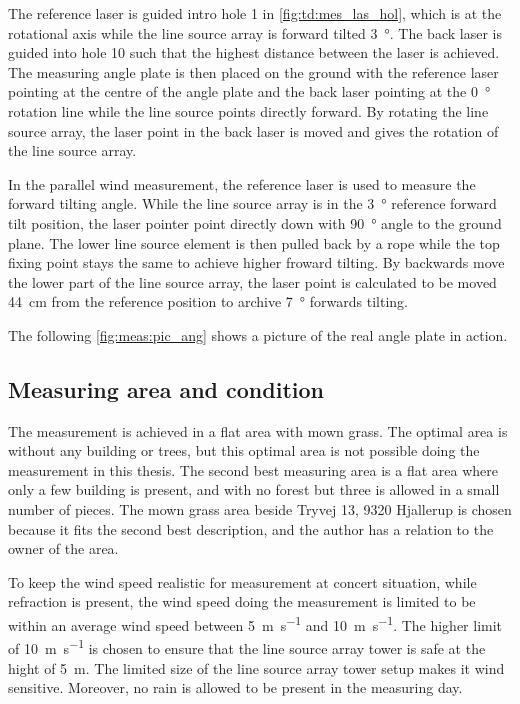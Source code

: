 The reference laser is guided intro hole 1 in \autoref{fig:td:mes_las_hol}, which is at the rotational axis while the line source array is forward tilted \SI{3}{\degree}. The back laser is guided into hole 10 such that the highest distance between the laser is achieved. The measuring angle plate is then placed on the ground with the reference laser pointing at the centre of the angle plate and the back laser pointing at the \SI{0}{\degree} rotation line while the line source points directly forward. By rotating the line source array, the laser point in the back laser is moved and gives the rotation of the line source array.

In the parallel wind measurement, the reference laser is used to measure the forward tilting angle. While the line source array is in the \SI{3}{\degree} reference forward tilt position, the laser pointer point directly down with \SI{90}{\degree} angle to the ground plane. The lower line source element is then pulled back by a rope while the top fixing point stays the same to achieve higher froward tilting. By backwards move the lower part of the line source array, the laser point is calculated to be moved \SI{44}{\centi\meter} from the reference position to archive \SI{7}{\degree} forwards tilting.

The following \autoref{fig:meas:pic_ang} shows a picture of the real angle plate in action.


\subsection{Measuring area and condition}
The measurement is achieved in a flat area with mown grass. The optimal area is without any building or trees, but this optimal area is not possible doing the measurement in this thesis. The second best measuring area is a flat area where only a few building is present, and with no forest but three is allowed in a small number of pieces. The mown grass area beside Tryvej 13, 9320 Hjallerup is chosen because it fits the second best description, and the author has a relation to the owner of the area.


To keep the wind speed realistic for measurement at concert situation, while refraction is present, the wind speed doing the measurement is limited to be within an average wind speed between \SI{5}{\meter\per\second} and \SI{10}{\meter\per\second}. The higher limit of  \SI{10}{\meter\per\second} is chosen to ensure that the line source array tower is safe at the hight of \SI{5}{\meter}. The limited size of the line source array tower setup makes it wind sensitive. Moreover, no rain is allowed to be present in the measuring day.

